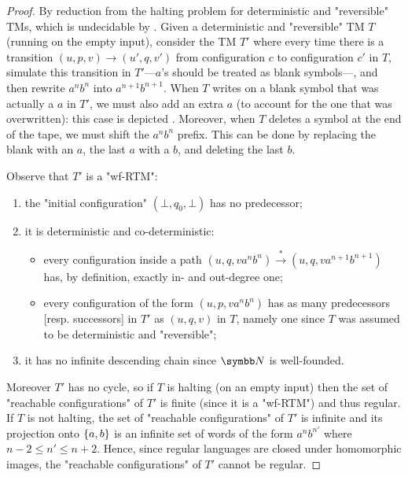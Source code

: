 \begin{proof}
    By reduction from the halting problem for deterministic and "reversible" TMs, which is undecidable by . Given a deterministic and "reversible" TM $T$ (running on the empty input), consider the TM $T'$ where every time there is a transition $(u, p, v) \to (u', q, v')$ from configuration $c$ to configuration $c'$ in $T$,
	simulate this transition in $T'$---$a$'s should be treated as blank symbols---,
	and then rewrite $a^n b^n$ into $a^{n+1}b^{n+1}$.
	When $T$ writes on a blank symbol that was actually a $a$ in $T'$,
	we must also add an extra $a$ (to account for the one that was overwritten):
	this case is depicted .
	Moreover, when $T$ deletes a symbol at the end of the tape,
	we must shift the $a^n b^n$ prefix. This can be done by replacing the blank
	with an $a$, the last $a$ with a $b$, and deleting the last $b$.
	
    Observe that $T'$ is a "wf-RTM":
    \begin{enumerate}
        \item the "initial configuration" $(\bot,q_0,\bot)$ has no predecessor;
        \item it is deterministic and co-deterministic:
        \begin{itemize}
            \item every configuration inside a path $(u, q, v a^n b^n) \xrightarrow{*} (u, q, v a^{n+1} b^{n+1})$ 
            has, by definition, exactly in- and out-degree one;
            \item every configuration of the form $(u, p, v a^n b^n)$ has as many predecessors [resp.  
                successors] in $T'$ as $(u,q,v)$ in $T$, namely one since $T$ was assumed to be
                deterministic and "reversible";
        \end{itemize}
        \item it has no infinite descending chain since $\N$ is well-founded.
    \end{enumerate}
    Moreover $T'$ has no cycle,
    so if $T$ is halting (on an empty input) then the set of "reachable configurations" of $T'$ is finite (since it is a "wf-RTM") and thus regular. If $T$ is not halting, the set of "reachable configurations" of $T'$ is infinite and its projection onto $\{a,b\}$ is an infinite set of words of the form $a^{n} b^{n'}$ where $n-2 \leq n' \leq n+2$. Hence, since regular languages are closed under homomorphic images, the "reachable configurations" of $T'$ cannot be regular.
\end{proof}



